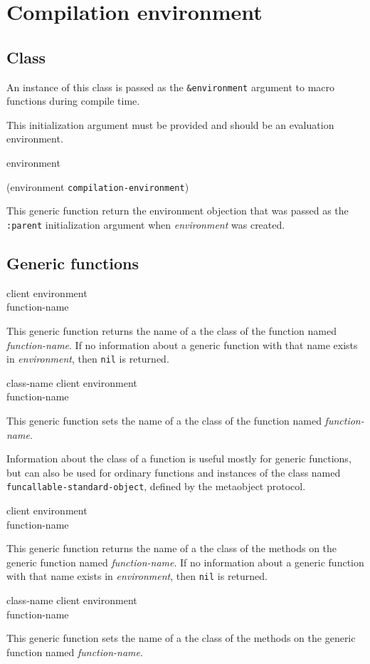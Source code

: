 \chapter{Compilation environment}

\section{Class}


An instance of this class is passed as the \texttt{\&environment}
argument to macro functions during compile time.


This initialization argument must be provided and should be
an evaluation environment.

 {environment}

 {(environment {\tt compilation-environment})}

This generic function return the environment objection that was passed
as the \texttt{:parent} initialization argument when
\textit{environment} was created.

\section{Generic functions}

 {client environment \\ function-name}

This generic function returns the name of a the class of the function
named \textit{function-name}.  If no information about a generic
function with that name exists in \textit{environment}, then
\texttt{nil} is returned.

 {class-name client environment \\
function-name}

This generic function sets the name of a the class of the function
named \textit{function-name}.

Information about the class of a function is useful mostly for generic
functions, but can also be used for ordinary functions and instances
of the class named \texttt{funcallable-standard-object}, defined by
the metaobject protocol.

 {client environment \\ function-name}

This generic function returns the name of a the class of the methods
on the generic function named \textit{function-name}.  If no information
about a generic function with that name exists in
\textit{environment}, then \texttt{nil} is returned.

 {class-name client environment \\
function-name}

This generic function sets the name of a the class of the methods on
the generic function named \textit{function-name}.
